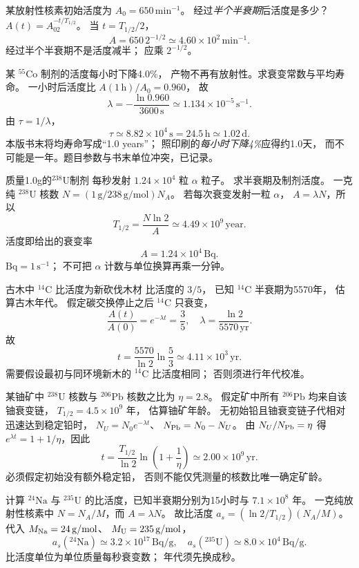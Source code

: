 某放射性核素初始活度为
$A_0=650\,\mathrm{min^{-1}}$。
经过\emph{半个半衰期}后活度是多少？
\exsolution
$A(t)=A_02^{-t/T_{1/2}}$。
当 $t=T_{1/2}/2$，
\[
 \boxed{A=650\,2^{-1/2}
 \simeq4.60\times10^2\,\mathrm{min^{-1}}}.
\]
\excheck 经过半个半衰期不是活度减半；
应乘 $2^{-1/2}$。

某 $\mathrm{^{55}Co}$ 制剂的活度每小时下降4.0\%，
产物不再有放射性。求衰变常数与平均寿命。
\exsolution
一小时后活度比
$A(1\,\mathrm h)/A_0=0.960$，
故
\[
 \boxed{\lambda=-\frac{\ln0.960}{3600\,\mathrm s}
 \simeq1.134\times10^{-5}\,\mathrm{s^{-1}}}.
\]
由 $\tau=1/\lambda$，
\[
 \boxed{\tau\simeq8.82\times10^4\,\mathrm s
 =24.5\,\mathrm h\simeq1.02\,\mathrm d}.
\]
\excheck 本版书末将均寿命写成“1.0 years”；
照印刷的\emph{每小时下降4\%}应得约1.0天，
而不可能是一年。题目参数与书末单位冲突，已记录。

质量1.0g的$\mathrm{^{238}U}$制剂
每秒发射 $1.24\times10^4$ 粒 $\alpha$ 粒子。
求半衰期及制剂活度。
\exsolution
一克纯 $\mathrm{^{238}U}$ 核数
$N=(1\,\mathrm g/238\,\mathrm{g/mol})N_A$。
若每次衰变发射一粒 $\alpha$，
$A=\lambda N$，所以
\[
 \boxed{T_{1/2}=\frac{N\ln2}{A}
 \simeq4.49\times10^9\,\mathrm{year}}.
\]
活度即给出的衰变率
\[
 \boxed{A=1.24\times10^4\,\mathrm{Bq}}.
\]
\excheck $\mathrm{Bq}=1\,\mathrm{s^{-1}}$；
不可把 $\alpha$ 计数与单位换算再乘一分钟。

古木中 $\mathrm{^{14}C}$ 比活度为新砍伐木材
比活度的 $3/5$，
已知 $\mathrm{^{14}C}$ 半衰期为5570年，
估算古木年代。
\exsolution
假定碳交换停止之后 $\mathrm{^{14}C}$ 只衰变，
\[
 \frac{A(t)}{A(0)}=e^{-\lambda t}=\frac35,\quad
 \lambda=\frac{\ln2}{5570\,\mathrm{yr}}.
\]
故
\[
 \boxed{t=\frac{5570}{\ln2}\ln\frac53
 \simeq4.11\times10^3\,\mathrm{yr}}.
\]
\excheck 需要假设最初与同环境新木的
$\mathrm{^{14}C}$ 比活度相同；
否则须进行年代校准。

某铀矿中 $\mathrm{^{238}U}$ 核数与
$\mathrm{^{206}Pb}$ 核数之比为
$\eta=2.8$。
假定矿中所有 $\mathrm{^{206}Pb}$
均来自该铀衰变链，
$T_{1/2}=4.5\times10^9$ 年，
估算铀矿年龄。
\exsolution
无初始铅且铀衰变链子代相对迅速达到稳定铅时，
$N_U=N_0e^{-\lambda t}$、
$N_{\rm Pb}=N_0-N_U$。
由 $N_U/N_{\rm Pb}=\eta$ 得
$e^{\lambda t}=1+1/\eta$，因此
\[
 \boxed{t=\frac{T_{1/2}}{\ln2}
 \ln\left(1+\frac1\eta\right)
 \simeq2.00\times10^9\,\mathrm{yr}}.
\]
\excheck 必须假定初始没有额外稳定铅，
否则不能仅凭测量的核数比唯一确定矿龄。

计算 $\mathrm{^{24}Na}$ 与 $\mathrm{^{235}U}$
的比活度，已知半衰期分别为15小时与
$7.1\times10^8$ 年。
\exsolution
一克纯放射性核素中
$N=N_A/M$，而 $A=\lambda N$。
故比活度
$a_s=(\ln2/T_{1/2})(N_A/M)$。
代入 $M_{\rm Na}=24\,\mathrm{g/mol}$、
$M_{\rm U}=235\,\mathrm{g/mol}$，
\[
 \boxed{a_s(\mathrm{^{24}Na})\simeq
 3.2\times10^{17}\,\mathrm{Bq/g}},
\quad
 \boxed{a_s(\mathrm{^{235}U})\simeq
 8.0\times10^{4}\,\mathrm{Bq/g}}.
\]
\excheck 比活度单位为单位质量每秒衰变数；
年代须先换成秒。

